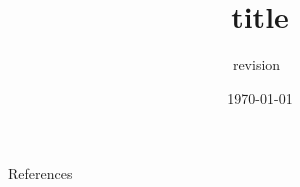 \documentclass[unicode,12pt,xcolor={svgnames}]{beamer}
\title{title}
\author{}
\institute{}
\date{\today}
\subtitle{revision~\texttt{}}
\begin{document}
\begin{frame}
	\titlepage{}
\end{frame} %


\appendix
\begin{frame}[c,allowframebreaks]{References} %
	\printbibliography[heading=none] %
\end{frame} %
\end{document}
